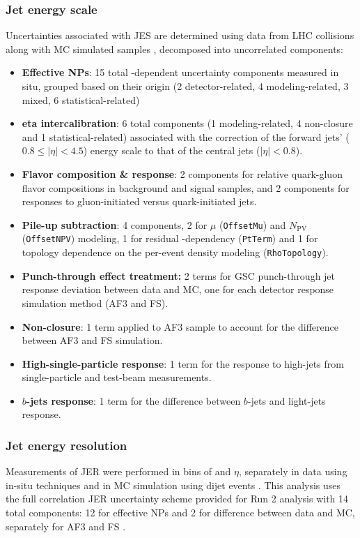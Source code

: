\documentclass[../thesis.tex]{subfiles}
\begin{document}
\subsubsection*{Jet energy scale}
Uncertainties associated with \acs{JES} are determined using data from \acs{LHC} collisions along with \acs{MC} simulated samples \citep{reco:jet_jes}, decomposed into uncorrelated components:
\begin{itemize}
\item \textbf{Effective \acs{NP}s}: 15 total \pT-dependent uncertainty components measured in situ, grouped based on their origin (2 detector-related, 4 modeling-related, 3 mixed, 6 statistical-related)
\item \textbf{\acs{eta} intercalibration}: 6 total components (1 modeling-related, 4 non-closure and 1 statistical-related) associated with the correction of the forward jets' ($0.8\leq |\eta| < 4.5$) energy scale to that of the central jets ($|\eta| < 0.8$).
\item \textbf{Flavor composition \& response}: 2 components for relative quark-gluon flavor compositions in background and signal samples, and 2 components for responses to gluon-initiated versus quark-initiated jets.
\item \textbf{Pile-up subtraction}: 4 components, 2 for $\mu$ (\verb|OffsetMu|) and $N_\mathrm{PV}$ (\verb|OffsetNPV|) modeling, 1 for residual \pT-dependency (\verb|PtTerm|) and 1 for topology dependence on the per-event \pT density modeling (\verb|RhoTopology|).
\item \textbf{Punch-through effect treatment:} 2 terms for \acs{GSC} punch-through jet response deviation between data and \acs{MC}, one for each detector response simulation method (\acs{AF3} and \acs{FS}).
\item \textbf{Non-closure}: 1 term applied to \acs{AF3} sample to account for the difference between \acs{AF3} and \acs{FS} simulation.
\item \textbf{High-\pT single-particle response}: 1 term for the response to high-\pT jets from single-particle and test-beam measurements.
\item \textbf{$b$-jets response}: 1 term for the difference between $b$-jets and light-jets response.
\end{itemize}

\subsubsection*{Jet energy resolution}
Measurements of \acs{JER} were performed in bins of \pT and $\eta$, separately in data using in-situ techniques and in \acs{MC} simulation using dijet events \citep{reco:jet_jer}. This analysis uses the full correlation \acs{JER} uncertainty scheme provided for Run 2 analysis with 14 total components: 12 for effective \acs{NP}s and 2 for difference between data and \acs{MC}, separately for \acs{AF3} and \acs{FS} \citep{reco:jet_jer}.
\end{document}
